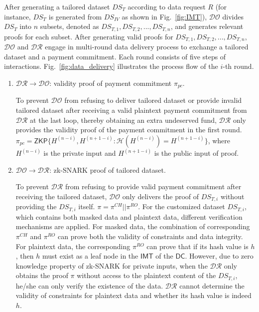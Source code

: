 \documentclass[journal]{IEEEtran}
\begin{document}
After generating a tailored dataset $DS_T$ according to data request $R$ (for instance, $DS_T$ is generated from $DS_{IV}$ as shown in Fig.~\ref{fig:IMT}), $\mathcal{DO}$ divides $DS_T$ into $n $ subsets, denoted as $DS_{T,1}, DS_{T,2},...,DS_{T,n}$, and generates relevant proofs for each subset. After generating valid proofs for $DS_{T,1}, DS_{T,2},...,DS_{T,n}$, $\mathcal{DO}$ and $\mathcal{DR}$ engage in multi-round data delivery process to exchange a tailored dataset and a payment commitment. Each round consists of five steps of interactions. Fig.~\ref{fig:data_delivery} illustrates the process flow of the $i$-th round.
\begin{enumerate}
    \item $\mathcal{DR} \rightarrow \mathcal{DO}$: validity proof of payment commitment $\pi_{pc}$.
    
    To prevent $\mathcal{DO}$ from refusing to deliver tailored dataset or provide invalid tailored dataset after receiving a valid plaintext payment commitment from $\mathcal{DR}$ at the last loop, thereby obtaining an extra undeserved fund, $\mathcal{DR}$ only provides the validity proof of the payment commitment in the first round. $\pi_{pc} = \mathsf{ZKP}\{H^{(n-i)},H^{(n+1-i)} : \mathcal{H}(H^{(n-i)}) = H^{(n+1-i)}\}$,  where $H^{(n-i)}$ is the private input and $H^{(n+1-i)}$ is the public input of proof.
    
    \item $\mathcal{DO} \rightarrow \mathcal{DR}$: zk-SNARK proof of tailored dataset.
    
    To prevent $\mathcal{DR}$ from refusing to provide valid payment commitment after receiving the tailored dataset, $\mathcal{DO}$ only delivers the proof of $DS_{T,i}$ without providing the $DS_{T,i}$ itself. $\pi = \pi^{CH} || \pi^{RO}$. 
    For the customized dataset $DS_{T,i}$, which contains both masked data and plaintext data, different verification mechanisms are applied. For masked data, the combination of corresponding $\pi^{CH}$ and $\pi^{RO}$ can prove both the validity of constraints and data integrity. For plaintext data, the corresponding $\pi^{RO}$ can prove that if its hash value is $h$, then $h$ must exist as a leaf node in the $\mathsf{IMT}$ of the $\mathsf{DC}$. However, due to zero knowledge property of zk-SNARK for private inputs, when the $\mathcal{DR}$ only obtains the proof $\pi$ without access to the plaintext content of the $DS_{T,i}$, he/she can only verify the existence of the data.  $\mathcal{DR}$ cannot determine the validity of constraints for plaintext data and whether its hash value is indeed $h$.
    

\end{enumerate}
\end{document}
